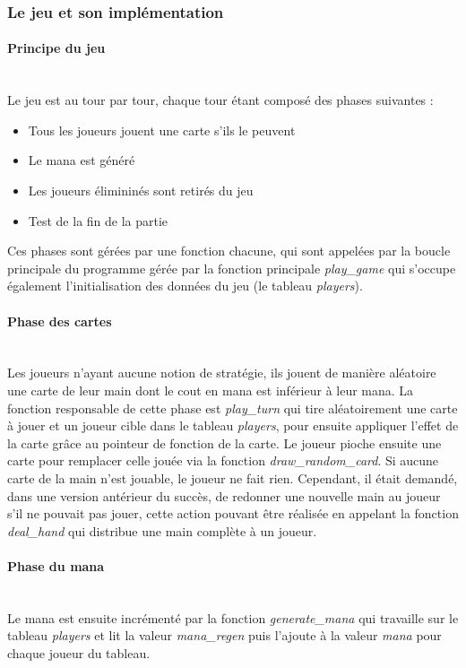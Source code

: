 \documentclass[12pt]{article}
\begin{document}
\subsubsection{Le jeu et son implémentation}
\paragraph{Principe du jeu} ~\\
\smallbreak
Le jeu est au tour par tour, chaque tour étant composé des phases suivantes :
\begin{itemize}
\item Tous les joueurs jouent une carte s'ils le peuvent
\item Le mana est généré
\item Les joueurs élimininés sont retirés du jeu
\item Test de la fin de la partie
\end{itemize}
Ces phases sont gérées par une fonction chacune, qui sont appelées par la boucle principale du programme gérée par la fonction principale \textit{play\_game} qui s'occupe également l'initialisation des données du jeu (le tableau \textit{players}).
\smallbreak
\paragraph{Phase des cartes} ~\\
\smallbreak
Les joueurs n'ayant aucune notion de stratégie, ils jouent de manière aléatoire une carte de leur main dont le cout en mana est inférieur à leur mana.
La fonction responsable de cette phase est \textit{play\_turn} qui tire aléatoirement une carte à jouer et un joueur cible dans le tableau \textit{players}, pour ensuite appliquer l'effet de la carte grâce au pointeur de fonction de la carte.
Le joueur pioche ensuite une carte pour remplacer celle jouée via la fonction \textit{draw\_random\_card}.
Si aucune carte de la main n'est jouable, le joueur ne fait rien. Cependant, il était demandé, dans une version antérieur du succès, de redonner une nouvelle main au joueur s'il ne pouvait pas jouer, cette action pouvant être réalisée en appelant la fonction \textit{deal\_hand} qui distribue une main complète à un joueur.
\smallbreak
\paragraph{Phase du mana} ~\\
\smallbreak
Le mana est ensuite incrémenté par la fonction \textit{generate\_mana} qui travaille sur le tableau \textit{players} et lit la valeur \textit{mana\_regen} puis l'ajoute à la valeur \textit{mana} pour chaque joueur du tableau.
\smallbreak
\end{document}
